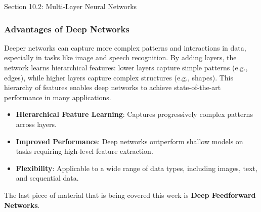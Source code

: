 \begin{notes}{Section 10.2: Multi-Layer Neural Networks}
    \subsubsection*{Advantages of Deep Networks}
    
    Deeper networks can capture more complex patterns and interactions in data, especially in tasks like image and speech recognition. By adding layers, the network learns hierarchical features: lower layers 
    capture simple patterns (e.g., edges), while higher layers capture complex structures (e.g., shapes). This hierarchy of features enables deep networks to achieve state-of-the-art performance in many applications.
    
    \begin{highlight}
        \begin{itemize}
            \item \textbf{Hierarchical Feature Learning}: Captures progressively complex patterns across layers.
            \item \textbf{Improved Performance}: Deep networks outperform shallow models on tasks requiring high-level feature extraction.
            \item \textbf{Flexibility}: Applicable to a wide range of data types, including images, text, and sequential data.
        \end{itemize}
    \end{highlight}
\end{notes}

The last piece of material that is being covered this week is \textbf{Deep Feedforward Networks}.

